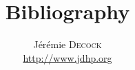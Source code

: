 \documentclass{article}
\title{Bibliography}
\author{Jérémie \textsc{Decock} \\ \url{http://www.jdhp.org}}
\begin{document}




\nocite{*}                    %

\end{document}
